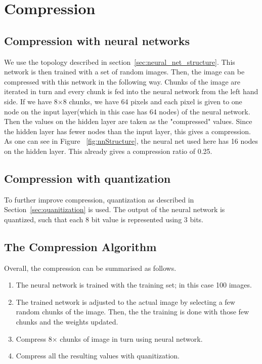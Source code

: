 \section{Compression}

\subsection{Compression with neural networks}
We use the topology described in section~\ref{sec:neural_net_structure}. This network is then trained with a set of random images. Then, the image can be compressed with this network in the following way. Chunks of the image are iterated in turn and every chunk is fed into the neural network from the left hand side. If we have 8$\times$8 chunks, we have 64 pixels and each pixel is given to one node on the input layer(which in this case has 64 nodes) of the neural network. Then the values on the hidden layer are taken as the "compressed" values. Since the hidden layer has fewer nodes than the input layer, this gives a compression. As one can see in Figure ~\ref{fig:nnStructure}, the neural net used here has 16 nodes on the hidden layer. This already gives a compression ratio of 0.25. 

\subsection{Compression with quantization}
To further improve compression, quantization as described in Section~\ref{sec:quanitization} is used. The output of the neural network is quantized, such that each 8 bit value is represented using 3 bits.  

\subsection{The Compression Algorithm}
\label{sec:compAlg}

Overall, the compression can be summarised as follows.

\begin{enumerate}
\item The neural network is trained with the training set; in this case 100 images.
\item The trained network is adjusted to the actual image by selecting a few random chunks of the image. Then, the the training is done with those few chunks and the weights updated. 
\item Compress 8$\times$ chunks of image in turn using neural network.
\item Compress all the resulting values with quanitization.

\end{enumerate}
